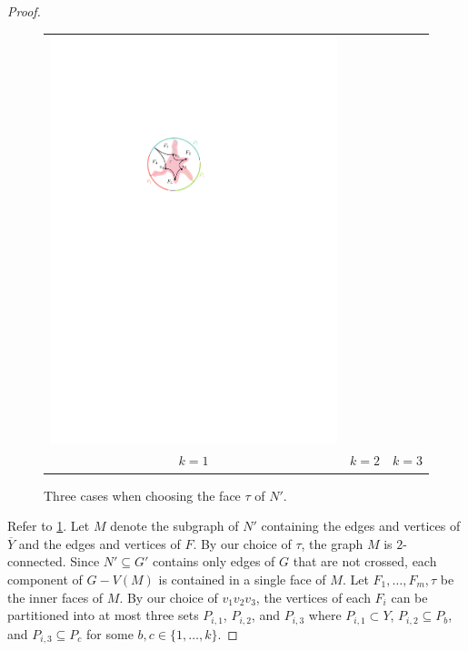 \documentclass{patmorin}
\theoremstyle{plain}
\theoremstyle{definition}
\begin{document}
\begin{proof}
\begin{figure}
\begin{center}
\begin{tabular}{ccc}
				\includegraphics{figs/zoomba-3} \\
				$k=1$ & $k=2$ & $k=3$
			\end{tabular}
		\end{center}
		\caption{Three cases when choosing the face $\tau$ of $N'$.}
		\label{boring_figure}
	\end{figure}

	Refer to \cref{boring_figure}.  Let $M$ denote the subgraph of $N'$ containing the edges and vertices of $\overline{Y}$ and the edges and vertices of $F$. By our choice of $\tau$, the graph $M$ is $2$-connected.  Since $N'\subseteq G'$ contains only edges of $G$ that are not crossed, each component of $G-V(M)$ is contained in a single face of $M$.
	Let $F_1,\ldots,F_m,\tau$ be the inner faces of $M$. By our choice of $v_1v_2v_3$, the vertices of each $F_i$ can be partitioned into at most three sets $P_{i,1}$, $P_{i,2}$, and $P_{i,3}$ where $P_{i,1}\subset Y$, $P_{i,2}\subseteq P_b$, and $P_{i,3}\subseteq P_c$ for some $b,c\in\{1,\ldots,k\}$.


\end{proof}
\end{document}

